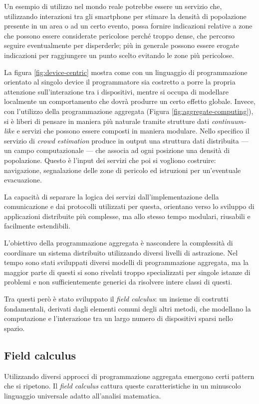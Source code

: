 Un esempio di utilizzo nel mondo reale potrebbe essere un servizio che,
utilizzando interazioni tra gli smartphone per stimare la densità di popolazione
presente in un area o ad un certo evento, possa fornire indicazioni relative a
zone che possono essere considerate pericolose perché troppo dense, che percorso
seguire eventualmente per disperderle; più in generale possono essere erogate
indicazioni per raggiungere un punto scelto evitando le zone più pericolose.

La figura \ref{fig:device-centric} mostra come con un linguaggio di
programmazione orientato al singolo device il programmatore sia costretto a
porre la propria attenzione sull'interazione tra i dispositivi, mentre si occupa
di modellare localmente un comportamento che dovrà produrre un certo effetto
globale.  Invece, con l'utilizzo della programmazione aggregata (Figura
\ref{fig:aggregate-computing}), si è liberi di pensare in maniera più naturale
tramite strutture dati \textit{continuum-like} e servizi che possono essere
composti in maniera modulare.  Nello specifico il servizio di \textit{crowd
  estimation} produce in output una struttura dati distribuita --- un campo
computazionale --- che associa ad ogni posizione una densità di
popolazione. Questo è l'input dei servizi che poi si vogliono costruire:
navigazione, segnalazione delle zone di pericolo ed istruzioni per un'eventuale
evacuazione.

La capacità di separare la logica dei servizi dall'implementazione della
comunicazione e dai protocolli utilizzati per questa, orientano verso lo
sviluppo di applicazioni distribuite più complesse, ma allo stesso tempo
modulari, riusabili e facilmente estendibili.

L'obiettivo della programmazione aggregata è nascondere la complessità di
coordinare un sistema distribuito utilizzando diversi livelli di astrazione.
Nel tempo sono stati sviluppati diversi modelli di programmazione aggregata, ma
la maggior parte di questi si sono rivelati troppo specializzati per singole
istanze di problemi e non sufficientemente generici da risolvere intere classi
di questi\cite{beal2012}.

Tra questi però è stato sviluppato il \textit{field calculus}: un insieme di
costrutti fondamentali, derivati dagli elementi comuni degli altri metodi, che
modellano la computazione e l'interazione tra un largo numero di dispositivi
sparsi nello spazio.

\subsection{Field calculus}
Utilizzando diversi approcci di programmazione aggregata emergono certi pattern
che si ripetono. Il \textit{field calculus} \cite{Viroli2013} cattura queste
caratteristiche in un minuscolo linguaggio universale adatto all'analisi
matematica.


